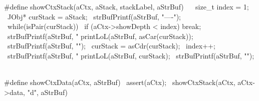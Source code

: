 \startCHeader
#define showCtxStack(aCtx, aStack, stackLabel, aStrBuf)       \
  {                                                           \
    size_t index = 1;                                         \
    JObj* curStack = aStack;                                  \
    strBufPrintf(aStrBuf, "----\n");                          \
    while(isPair(curStack)) {                                 \
      if (aCtx->showDepth < index) break;                     \
      strBufPrintf(aStrBuf, "%
      printLoL(aStrBuf, asCar(curStack));                     \
      strBufPrintf(aStrBuf, "\n");                            \
      curStack = asCdr(curStack);                             \
      index++;                                                \
    }                                                         \
    strBufPrintf(aStrBuf, "%
    printLoL(aStrBuf, curStack);                              \
    strBufPrintf(aStrBuf, "\n");                              \
  }

#define showCtxData(aCtx, aStrBuf)            \
  assert(aCtx);                               \
  showCtxStack(aCtx, aCtx->data, "d", aStrBuf)
\stopCHeader

